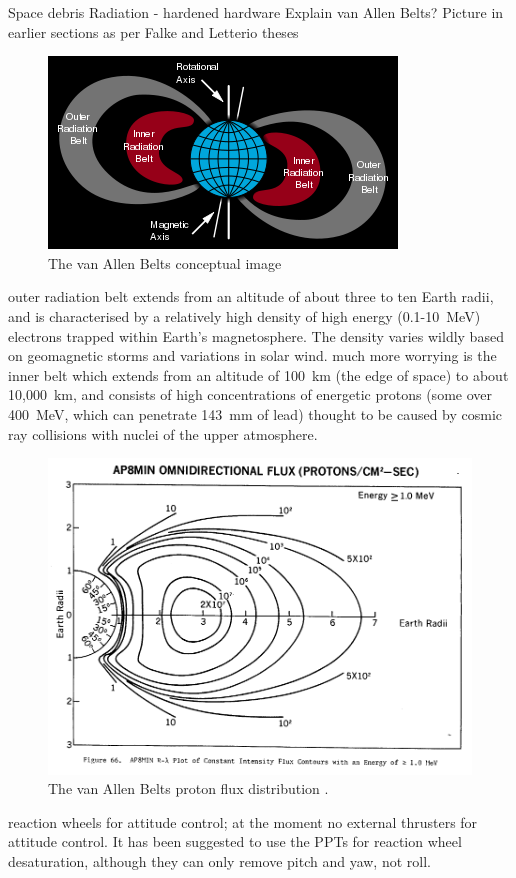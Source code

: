 Space debris
Radiation - hardened hardware
Explain van Allen Belts? Picture in earlier sections as per Falke and Letterio theses
\begin{figure}
\includegraphics[width=\textwidth]{Images/350px-Van_Allen_radiation_belt_svg.png}
\caption{The van Allen Belts conceptual image}\label{fig:vabs}
\end{figure}
outer radiation belt extends from an altitude of about three to ten Earth radii, and is characterised by a relatively high density of high energy (0.1-10~MeV) electrons trapped within Earth's magnetosphere. The density varies wildly based on geomagnetic storms and variations in solar wind.
much more worrying is the inner belt which extends from an altitude of 100~km (the edge of space) to about 10,000~km, and consists of high concentrations of energetic protons (some over 400~MeV, which can penetrate 143~mm of lead) thought to be caused by cosmic ray collisions with nuclei of the upper atmosphere.
\begin{figure}
\includegraphics[width=\textwidth]{Images/Ap8-omni-1_000MeV.png}
\caption{The van Allen Belts proton flux distribution \parencite{Sawyer1976}.}\label{fig:vabs}
\end{figure}
reaction wheels for attitude control; at the moment no external thrusters for attitude control. It has been suggested to use the PPTs for reaction wheel desaturation, although they can only remove pitch and yaw, not roll.

